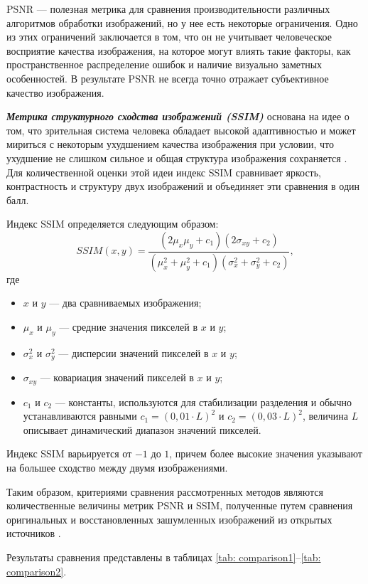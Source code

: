 PSNR --- полезная метрика для сравнения производительности различных алгоритмов обработки изображений, но у нее есть некоторые ограничения. Одно из этих ограничений заключается в том, что он не учитывает человеческое восприятие качества изображения, на которое могут влиять такие факторы, как пространственное распределение ошибок и наличие визуально заметных особенностей. В результате PSNR не всегда точно отражает субъективное качество изображения.

\textbf{\textit{Метрика структурного сходства изображений (SSIM)}} основана на идее  о том, что зрительная система человека обладает высокой адаптивностью и может мириться с некоторым ухудшением качества изображения при условии, что ухудшение не слишком сильное и общая структура изображения сохраняется \cite{metrics}. Для количественной оценки этой идеи индекс SSIM сравнивает яркость, контрастность и структуру двух изображений и объединяет эти сравнения в один балл.

Индекс SSIM определяется следующим образом:
\begin{equation}
    SSIM(x, y) = \frac{(2\mu_x\mu_y + c_1)(2\sigma_{xy} + c_2)}{(\mu_x^2 + \mu_y^2 + c_1)(\sigma_x^2 + \sigma_y^2 + c_2)},
\end{equation}
где
\begin{itemize}
    \item $x$ и $y$ --- два сравниваемых изображения;
    \item $\mu_x$ и $\mu_y$ --- средние значения пикселей в $x$ и $y$;
    \item $\sigma_x^2$ и $\sigma_y^2$ --- дисперсии значений пикселей в $x$ и $y$;
    \item $\sigma_{xy}$ --- ковариация значений пикселей в $x$ и $y$;
    \item $c_1$ и $c_2$ --- константы, используются для стабилизации разделения и обычно устанавливаются равными $c_1 = (0,01\cdot L)^2$ и $c_2 = (0,03\cdot L)^2$, величина $L$ описывает динамический диапазон значений пикселей.
\end{itemize}

Индекс SSIM варьируется от $-1$ до $1$, причем более высокие значения указывают на большее сходство между двумя изображениями.

Таким образом, критериями сравнения рассмотренных методов являются количественные величины метрик PSNR и SSIM, полученные путем сравнения оригинальных и восстановленных зашумленных изображений из открытых источников \cite{research}.

Результаты сравнения представлены в таблицах \ref{tab: comparison1}--\ref{tab: comparison2}.

